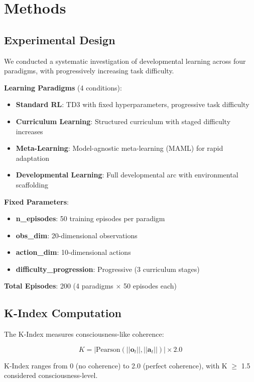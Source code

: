 \documentclass[10pt,letterpaper]{article}
\begin{document}
\section*{Methods}

\subsection*{Experimental Design}
We conducted a systematic investigation of developmental learning across four paradigms, with progressively increasing task difficulty.

\textbf{Learning Paradigms} (4 conditions):
\begin{itemize}
\item \textbf{Standard RL}: TD3 with fixed hyperparameters, progressive task difficulty
\item \textbf{Curriculum Learning}: Structured curriculum with staged difficulty increases
\item \textbf{Meta-Learning}: Model-agnostic meta-learning (MAML) for rapid adaptation
\item \textbf{Developmental Learning}: Full developmental arc with environmental scaffolding
\end{itemize}

\textbf{Fixed Parameters}:
\begin{itemize}
\item \textbf{n\_episodes}: 50 training episodes per paradigm
\item \textbf{obs\_dim}: 20-dimensional observations
\item \textbf{action\_dim}: 10-dimensional actions
\item \textbf{difficulty\_progression}: Progressive (3 curriculum stages)
\end{itemize}

\textbf{Total Episodes}: 200 (4 paradigms $\times$ 50 episodes each)

\subsection*{K-Index Computation}
The K-Index measures consciousness-like coherence:

\begin{equation}
K = |\text{Pearson}(||\mathbf{o}_t||, ||\mathbf{a}_t||)| \times 2.0
\end{equation}

K-Index ranges from 0 (no coherence) to 2.0 (perfect coherence), with K $\geq$ 1.5 considered consciousness-level.
\end{document}
